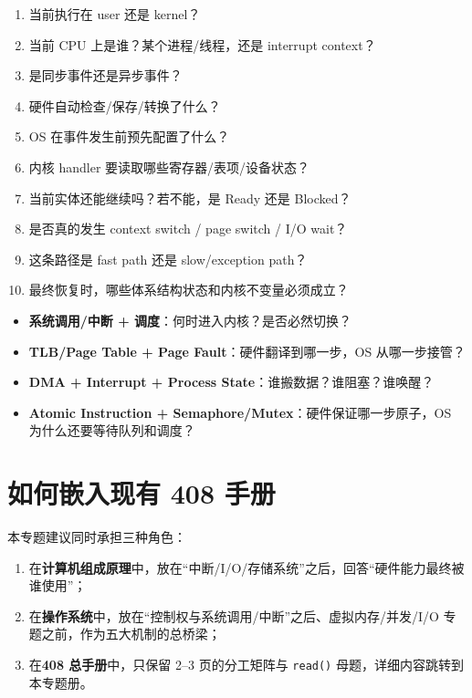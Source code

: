 \documentclass[11pt,a4paper]{ctexart}
\newcommand{\kw}[1]{\textbf{#1}}
\newcommand{\code}[1]{\texttt{#1}}
\begin{document}
\begin{method}[软硬件分工十问]
\begin{enumerate}
  \item 当前执行在 user 还是 kernel？
  \item 当前 CPU 上是谁？某个进程/线程，还是 interrupt context？
  \item 是同步事件还是异步事件？
  \item 硬件自动检查/保存/转换了什么？
  \item OS 在事件发生前预先配置了什么？
  \item 内核 handler 要读取哪些寄存器/表项/设备状态？
  \item 当前实体还能继续吗？若不能，是 Ready 还是 Blocked？
  \item 是否真的发生 context switch / page switch / I/O wait？
  \item 这条路径是 fast path 还是 slow/exception path？
  \item 最终恢复时，哪些体系结构状态和内核不变量必须成立？
\end{enumerate}
\end{method}

\begin{exam}[四类最常见综合题]
\begin{itemize}
  \item \kw{系统调用/中断 + 调度}：何时进入内核？是否必然切换？
  \item \kw{TLB/Page Table + Page Fault}：硬件翻译到哪一步，OS 从哪一步接管？
  \item \kw{DMA + Interrupt + Process State}：谁搬数据？谁阻塞？谁唤醒？
  \item \kw{Atomic Instruction + Semaphore/Mutex}：硬件保证哪一步原子，OS 为什么还要等待队列和调度？
\end{itemize}
\end{exam}

\section{如何嵌入现有 408 手册}

本专题建议同时承担三种角色：
\begin{enumerate}
  \item 在\kw{计算机组成原理}中，放在“中断/I/O/存储系统”之后，回答“硬件能力最终被谁使用”；
  \item 在\kw{操作系统}中，放在“控制权与系统调用/中断”之后、虚拟内存/并发/I/O 专题之前，作为五大机制的总桥梁；
  \item 在\kw{408 总手册}中，只保留 2--3 页的分工矩阵与 \code{read()} 母题，详细内容跳转到本专题册。
\end{enumerate}
\end{document}
